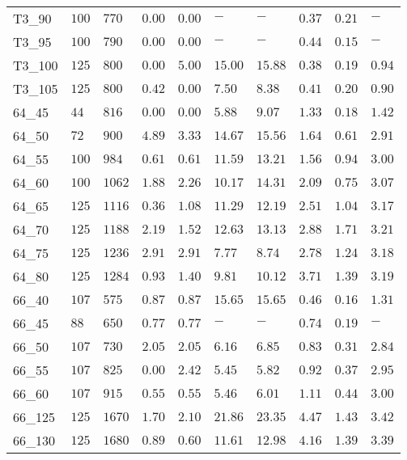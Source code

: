 \begin{center}
\begin{table}[]
\begin{tabular}{|lll|l|l|ll|lll|}
T3\_90  & $100  $ & $770 $ & $\bm{0.00}$ & $\bm{0.00}$   & $-$     & $-$     & $0.37$ & $0.21$   & $-   $ \\
T3\_95  & $100  $ & $790 $ & $\bm{0.00}$ & $\bm{0.00}$   & $-$     & $-$     & $0.44$ & $0.15$   & $-   $ \\
T3\_100 & $125  $ & $800 $ & $\bm{0.00}$ & $5.00$   & $15.00$ & $15.88$ & $0.38$ & $0.19$   & $0.94$ \\
T3\_105 & $125  $ & $800 $ & $0.42$ & $\bm{0.00}$   & $7.50$  & $8.38$  & $0.41$ & $0.20$   & $0.90$ \\
\hline
64\_45  & $44   $ & $816 $ & $\bm{0.00}$ & $\bm{0.00}$   & $5.88$  & $9.07$  & $1.33$ & $0.18$   & $1.42$ \\
64\_50  & $72   $ & $900 $ & $4.89$ & $3.33$   & $14.67$ & $15.56$ & $1.64$ & $0.61$   & $2.91$ \\
64\_55  & $100  $ & $984 $ & $0.61$ & $0.61$   & $11.59$ & $13.21$ & $1.56$ & $0.94$   & $3.00$ \\
64\_60  & $100  $ & $1062$ & $1.88$ & $2.26$   & $10.17$ & $14.31$ & $2.09$ & $0.75$   & $3.07$ \\
64\_65  & $125  $ & $1116$ & $0.36$ & $1.08$   & $11.29$ & $12.19$ & $2.51$ & $1.04$   & $3.17$ \\
64\_70  & $125  $ & $1188$ & $2.19$ & $1.52$   & $12.63$ & $13.13$ & $2.88$ & $1.71$   & $3.21$ \\
64\_75  & $125  $ & $1236$ & $2.91$ & $2.91$   & $7.77$  & $8.74$  & $2.78$ & $1.24$   & $3.18$ \\
64\_80  & $125  $ & $1284$ & $0.93$ & $1.40$   & $9.81$  & $10.12$ & $3.71$ & $1.39$   & $3.19$ \\
\hline
66\_40  & $107  $ & $575 $ & $0.87$ & $0.87$   & $15.65$ & $15.65$ & $0.46$ & $0.16$   & $1.31$ \\
66\_45  & $88   $ & $650 $ & $0.77$ & $0.77$   & $-$     & $-$     & $0.74$ & $0.19$   & $-   $ \\
66\_50  & $107  $ & $730 $ & $2.05$ & $2.05$   & $6.16$  & $6.85$  & $0.83$ & $0.31$   & $2.84$ \\
66\_55  & $107  $ & $825 $ & $\bm{0.00}$ & $2.42$   & $5.45$  & $5.82$  & $0.92$ & $0.37$   & $2.95$ \\
66\_60  & $107  $ & $915 $ & $0.55$ & $0.55$   & $5.46$  & $6.01$  & $1.11$ & $0.44$   & $3.00$ \\
66\_125 & $125  $ & $1670$ & $1.70$ & $2.10$   & $21.86$ & $23.35$ & $4.47$ & $1.43$   & $3.42$ \\
66\_130 & $125  $ & $1680$ & $0.89$ & $0.60$   & $11.61$ & $12.98$ & $4.16$ & $1.39$   & $3.39$ \\

\end{tabular}
\end{table}
\end{center}

